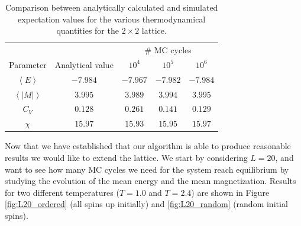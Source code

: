 \documentclass[12pt, a4paper]{article}
\begin{document}
\begin{table}[ht!]
\caption{Comparison between analytically calculated and simulated expectation values for the various 
thermodynamical quantities for the $2\times 2$ lattice.}
\label{tab:analytical_vs_sim}
\begin{center}
\begin{tabular}{ccccc} \hline\hline
 & & \multicolumn{3}{c}{$\#$ MC cycles} \\ 
Parameter & Analytical value & $10^4$ & $10^5$  & $10^6$ \\ \hline
$\left\langle E \right\rangle$ & $-7.984$ & $-7.967$ & $-7.982$ & $-7.984$ \\ 
$\left\langle |M| \right\rangle$ & $3.995$  & $3.989$  & $3.994$  & $3.995$  \\
$C_V$                          & $0.128$  & $0.261$  & $0.141$  & $0.129$  \\
$\chi$						   & $15.97$  & $15.93$  & $15.95$  & $15.97$  \\ \hline\hline
\end{tabular}
\end{center}
\end{table}

Now that we have established that our algorithm is able to produce reasonable results we would like 
to extend the lattice. We start by considering $L=20$, and want to see how many MC cycles we need for the 
system reach equilibrium by studying the evolution of the mean energy and the mean magnetization.  
Results for two different temperatures ($T=1.0$ and $T=2.4$) are shown in Figure \ref{fig:L20_ordered} 
(all spins up initially) and \ref{fig:L20_random} (random initial spins). 
\end{document}
